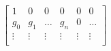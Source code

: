 \documentclass[preview]{standalone}
\begin{document}
\begin{align*}
\begin{bmatrix}1 & 0 & 0 & 0 & 0 & 0 \\g_0 & g_1 & \ldots & g_n & 0 & \ldots \\\vdots & \vdots & \vdots & \vdots & \vdots & \vdots \\\end{bmatrix}
\end{align*}
\end{document}
